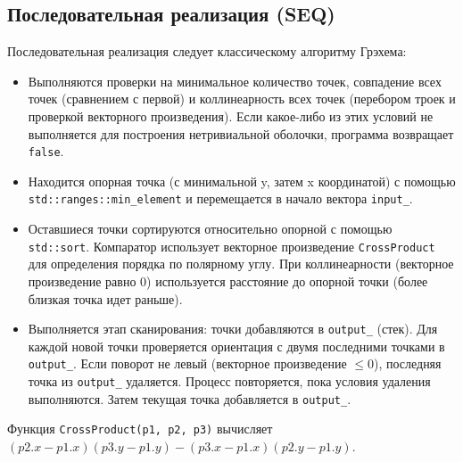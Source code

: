 \documentclass[12pt]{article}
\begin{document}
\subsection{Последовательная реализация (SEQ)}
Последовательная реализация следует классическому алгоритму Грэхема:
\begin{itemize}
    \item Выполняются проверки на минимальное количество точек, совпадение всех точек (сравнением с первой) и коллинеарность всех точек (перебором троек и проверкой векторного произведения). Если какое-либо из этих условий не выполняется для построения нетривиальной оболочки, программа возвращает \texttt{false}.
    \item Находится опорная точка (с минимальной y, затем x координатой) с помощью \\\texttt{std::ranges::min\_element} и перемещается в начало вектора \texttt{input\_}.
    \item Оставшиеся точки сортируются относительно опорной с помощью \texttt{std::sort}. Компаратор использует векторное произведение \texttt{CrossProduct} для определения порядка по полярному углу. При коллинеарности (векторное произведение равно 0) используется расстояние до опорной точки (более близкая точка идет раньше).
    \item Выполняется этап сканирования: точки добавляются в \texttt{output\_} (стек). Для каждой новой точки проверяется ориентация с двумя последними точками в \texttt{output\_}. Если поворот не левый (векторное произведение $\le 0$), последняя точка из \texttt{output\_} удаляется. Процесс повторяется, пока условия удаления выполняются. Затем текущая точка добавляется в \texttt{output\_}.
\end{itemize}
Функция \texttt{CrossProduct(p1, p2, p3)} вычисляет $(p2.x - p1.x)(p3.y - p1.y) - (p3.x - p1.x)(p2.y - p1.y)$.
\end{document}
